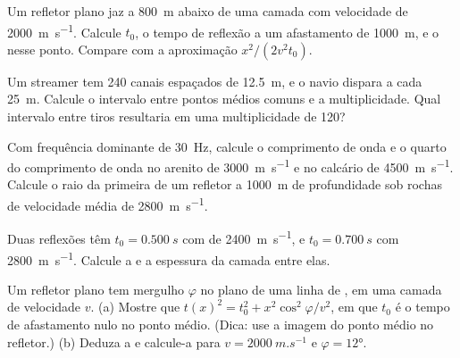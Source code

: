 \begin{exercise}[$\star$]\label{exo:b3:exploration-seismology:2}
Um refletor plano jaz a \qty{800}{m} abaixo de uma camada com velocidade de \qty{2000}{m.s^{-1}}.
Calcule $t_0$, o tempo de reflexão a um afastamento de \qty{1000}{m}, e o 
nesse ponto. Compare com a aproximação $x^2/(2v^2t_0)$.
\end{exercise}

\begin{exercise}[$\star$]\label{exo:b3:exploration-seismology:3}
Um streamer tem 240 canais espaçados de \qty{12.5}{m}, e o navio dispara a cada
\qty{25}{m}. Calcule o intervalo entre pontos médios comuns e a multiplicidade. Qual intervalo entre tiros
resultaria em uma multiplicidade de 120?
\end{exercise}

\begin{exercise}[$\star$]\label{exo:b3:exploration-seismology:4}
Com frequência dominante de \qty{30}{Hz}, calcule o comprimento de onda e o
quarto do comprimento de onda no arenito de \qty{3000}{m.s^{-1}} e no calcário de
\qty{4500}{m.s^{-1}}. Calcule o raio da primeira  de um
refletor a \qty{1000}{m} de profundidade sob rochas de velocidade média de \qty{2800}{m.s^{-1}}.
\end{exercise}

\begin{exercise}[$\star\star$]\label{exo:b3:exploration-seismology:5}
Duas reflexões têm $t_0 = \qty{0.500}{s}$ com  de
\qty{2400}{m.s^{-1}}, e $t_0 = \qty{0.700}{s}$ com \qty{2800}{m.s^{-1}}.
Calcule a  e a espessura da camada entre elas.
\end{exercise}

\begin{exercise}[$\star\star$]\label{exo:b3:exploration-seismology:6}
Um refletor plano tem mergulho $\varphi$ no plano de uma linha de , em uma camada de
velocidade $v$. (a) Mostre que $t(x)^2 = t_0^2 + x^2\cos^2\varphi/v^2$, em que $t_0$ é
o tempo de afastamento nulo no ponto médio. (Dica: use a imagem do ponto médio no
refletor.) (b) Deduza a  e calcule-a para
$v = \qty{2000}{m.s^{-1}}$ e $\varphi = \ang{12}$.
\end{exercise}

